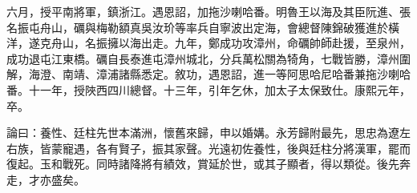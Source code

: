\begin{pinyinscope}
六月，授平南將軍，鎮浙江。遇恩詔，加拖沙喇哈番。明魯王以海及其臣阮進、張名振屯舟山，礪與梅勒額真吳汝玠等率兵自寧波出定海，會總督陳錦破獲進於橫洋，遂克舟山，名振擁以海出走。九年，鄭成功攻漳州，命礪帥師赴援，至泉州，成功退屯江東橋。礪自長泰進屯漳州城北，分兵萬松關為犄角，七戰皆勝，漳州圍解，海澄、南靖、漳浦諸縣悉定。敘功，遇恩詔，進一等阿思哈尼哈番兼拖沙喇哈番。十一年，授陜西四川總督。十三年，引年乞休，加太子太保致仕。康熙元年，卒。

論曰：養性、廷柱先世本滿洲，懷舊來歸，申以婚媾。永芳歸附最先，思忠為遼左右族，皆蒙寵遇，各有賢子，振其家聲。光遠初佐養性，後與廷柱分將漢軍，罷而復起。玉和戰死。同時諸降將有績效，賞延於世，或其子顯者，得以類從。後先奔走，才亦盛矣。


\end{pinyinscope}